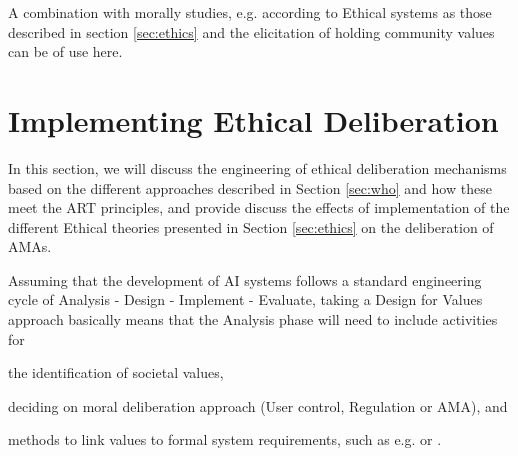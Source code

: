 \documentclass[twocolumn]{article}
\begin{document}
A combination with morally studies, e.g. according to Ethical systems as those described in section \ref{sec:ethics} and the elicitation of holding community values can be of use here.


\section{Implementing Ethical Deliberation}\label{sec:reasoning}
In this section, we will discuss the engineering of ethical deliberation mechanisms based on the different approaches described in Section \ref{sec:who} and how these meet the ART principles, and provide discuss the effects of implementation of the different Ethical theories presented in Section \ref{sec:ethics} on the deliberation of AMAs.

Assuming that the development of AI systems follows a standard engineering cycle of Analysis - Design - Implement - Evaluate, taking a Design for Values approach basically means that the Analysis phase will need to include activities for 
\begin{inparaenum}[(i)] 
\item the identification of societal values, 
\item deciding on moral deliberation approach (User control, Regulation or AMA), and
\item methods to link values to formal system requirements, such as e.g. \cite{vandePoel2013} or \cite{aldewereld2010making}.
\end{inparaenum}
\end{document}
